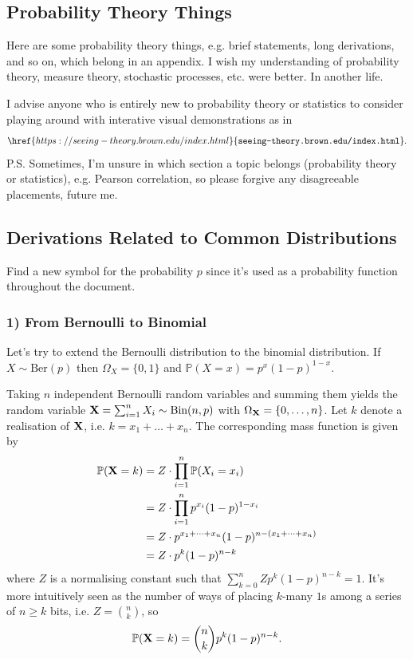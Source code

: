 \documentclass[11pt]{article}
\begin{document}
\newpage
\begin{appendices}

\section{Probability Theory Things}
Here are some probability theory things, e.g. brief statements, long derivations, and so on, which belong in an appendix. I wish my understanding of probability theory, measure theory, stochastic processes, etc. were better. In another life.

I advise anyone who is entirely new to probability theory or statistics to consider playing around with interative visual demonstrations as in
$$
\href{https://seeing-theory.brown.edu/index.html}{\texttt{seeing-theory.brown.edu/index.html}}.
$$
P.S. Sometimes, I'm unsure in which section a topic belongs (probability theory or statistics), e.g. Pearson correlation, so please forgive any disagreeable placements, future me.

\subsection{Derivations Related to Common Distributions}
\TODO Find a new symbol for the probability $p$ since it's used as a probability function throughout the document.

\subsubsection*{1) From Bernoulli to Binomial}
Let's try to extend the Bernoulli distribution to the binomial distribution. If $X\sim\text{Ber}(p)$ then $\Omega_X=\{0,1\}$ and $\mathbb{P}(X=x)=p^x(1-p)^{1-x}$.

Taking $n$ independent Bernoulli random variables and summing them yields the random variable $\mathbf{X}=\sum_{i=1}^nX_i\sim\text{Bin}(n,p)$ with $\Omega_{\mathbf{X}}=\{0,\dots,n\}$. Let $k$ denote a realisation of $\mathbf{X}$, i.e. $k=x_1+\dots+x_n$. The corresponding mass function is given by
\begin{align*}
    \mathbb{P}(\mathbf{X}=k)
    &=
    Z\cdot\prod_{i=1}^n\mathbb{P}(X_i=x_i)\\
    &=
    Z\cdot\prod_{i=1}^np^{x_i}(1-p)^{1-x_i}\\
    &=
    Z\cdot p^{x_1+\dots+x_n}(1-p)^{n-(x_1+\dots+x_n)}\\
    &=
    Z\cdot p^k(1-p)^{n-k}
\end{align*}
where $Z$ is a normalising constant such that $\sum_{k=0}^nZp^k(1-p)^{n-k}=1$. It's more intuitively seen as the number of ways of placing $k$-many $1$s among a series of $n\geq k$ bits, i.e. $Z=\binom{n}{k}$, so
$$
\mathbb{P}(\mathbf{X}=k)
=
\binom{n}{k}p^k(1-p)^{n-k}.
$$


\end{appendices}
\end{document}
